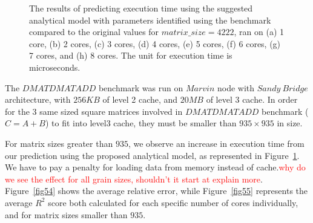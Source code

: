 \begin{figure}[H]
{		\label{fig53:g}}
	\caption{The results of predicting execution time using the suggested analytical model with parameters identified using the benchmark compared to the original values for $matrix\_{size}=4222$, ran on (a) 1 core, (b) 2 cores, (c) 3 cores, (d) 4 cores, (e) 5 cores, (f) 6 cores, (g) 7 cores, and (h) 8 cores. The unit for execution time is microseconds.}
	\label{fig53}	
\end{figure}

The $DMATDMATADD$ benchmark was run on $Marvin$ node with $Sandy\:Bridge$ architecture, with $256KB$ of level 2 cache, and $20MB$ of level 3 cache. In order for the $3$ same sized square matrices involved in $DMATDMATADD$ benchmark ($C=A+B$) to fit into level3 cache, they must be smaller than $935\times{935}$ in size. 

For matrix sizes greater than $935$, we observe an increase in execution time from our prediction using the proposed analytical model, as represented in Figure~\ref{fig53}. We have to pay a penalty for loading data from memory instead of cache.\textcolor{red}{why do we see the effect for all grain sizes, shouldn't it start at explain more}.
Figure~\ref{fig54} shows the average relative error, while Figure~\ref{fig55} represents the average $R^2$ score both calculated for each specific number of cores individually, and for matrix sizes smaller than $935$.

